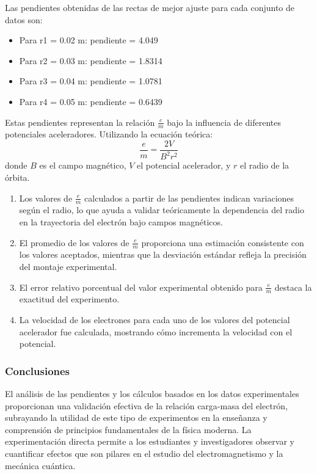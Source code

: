 Las pendientes obtenidas de las rectas de mejor ajuste para cada conjunto de datos son:
\begin{itemize}
    \item Para r1 = 0.02 m: pendiente = 4.049
    \item Para r2 = 0.03 m: pendiente = 1.8314
    \item Para r3 = 0.04 m: pendiente = 1.0781
    \item Para r4 = 0.05 m: pendiente = 0.6439
\end{itemize}

Estas pendientes representan la relación \( \frac{e}{m} \) bajo la influencia de diferentes potenciales aceleradores. Utilizando la ecuación teórica:
\[
\frac{e}{m} = \frac{2V}{B^2 r^2}
\]
donde \( B \) es el campo magnético, \( V \) el potencial acelerador, y \( r \) el radio de la órbita.

\begin{enumerate}
    \item Los valores de \( \frac{e}{m} \) calculados a partir de las pendientes indican variaciones según el radio, lo que ayuda a validar teóricamente la dependencia del radio en la trayectoria del electrón bajo campos magnéticos.
    \item El promedio de los valores de \( \frac{e}{m} \) proporciona una estimación consistente con los valores aceptados, mientras que la desviación estándar refleja la precisión del montaje experimental.
    \item El error relativo porcentual del valor experimental obtenido para \( \frac{e}{m} \) destaca la exactitud del experimento.
    \item La velocidad de los electrones para cada uno de los valores del potencial acelerador fue calculada, mostrando cómo incrementa la velocidad con el potencial.
\end{enumerate}

\subsubsection{Conclusiones}
El análisis de las pendientes y los cálculos basados en los datos experimentales proporcionan una validación efectiva de la relación carga-masa del electrón, subrayando la utilidad de este tipo de experimentos en la enseñanza y comprensión de principios fundamentales de la física moderna. La experimentación directa permite a los estudiantes y investigadores observar y cuantificar efectos que son pilares en el estudio del electromagnetismo y la mecánica cuántica.

